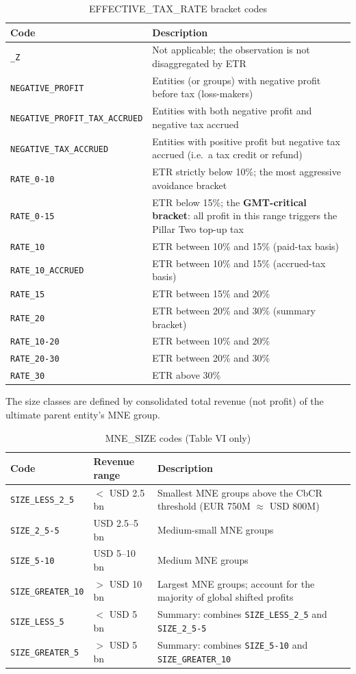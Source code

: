 \documentclass[11pt,a4paper]{article}
\newcommand{\code}[1]{\texttt{#1}}
\begin{document}
\begin{table}[H]
\centering
\caption{EFFECTIVE\_TAX\_RATE bracket codes}
\label{tab:etr}
\begin{tabular}{@{}lp{11cm}@{}}
\toprule
Code & Description \\
\midrule
\code{\_Z} & Not applicable; the observation is not disaggregated by ETR \\
\code{NEGATIVE\_PROFIT} & Entities (or groups) with negative profit before tax (loss-makers) \\
\code{NEGATIVE\_PROFIT\_TAX\_ACCRUED} & Entities with both negative profit and negative tax accrued \\
\code{NEGATIVE\_TAX\_ACCRUED} & Entities with positive profit but negative tax accrued (i.e.\ a tax credit or refund) \\
\code{RATE\_0-10} & ETR strictly below 10\%; the most aggressive avoidance bracket \\
\code{RATE\_0-15} & ETR below 15\%; the \textbf{GMT-critical bracket}: all profit in this range triggers the Pillar Two top-up tax \\
\code{RATE\_10} & ETR between 10\% and 15\% (paid-tax basis) \\
\code{RATE\_10\_ACCRUED} & ETR between 10\% and 15\% (accrued-tax basis) \\
\code{RATE\_15} & ETR between 15\% and 20\% \\
\code{RATE\_20} & ETR between 20\% and 30\% (summary bracket) \\
\code{RATE\_10-20} & ETR between 10\% and 20\% \\
\code{RATE\_20-30} & ETR between 20\% and 30\% \\
\code{RATE\_30} & ETR above 30\% \\
\bottomrule
\end{tabular}
\end{table}

The size classes are defined by consolidated total revenue (not profit) of the ultimate parent entity's MNE group. 

\begin{table}[H]
\centering
\caption{MNE\_SIZE codes (Table VI only)}
\label{tab:mnesize}
\begin{tabular}{@{}llp{8cm}@{}}
\toprule
Code & Revenue range & Description \\
\midrule
\code{SIZE\_LESS\_2\_5} & $<$ USD 2.5 bn & Smallest MNE groups above the CbCR threshold (EUR 750M $\approx$ USD 800M) \\
\code{SIZE\_2\_5-5} & USD 2.5--5 bn & Medium-small MNE groups \\
\code{SIZE\_5-10} & USD 5--10 bn & Medium MNE groups \\
\code{SIZE\_GREATER\_10} & $>$ USD 10 bn & Largest MNE groups; account for the majority of global shifted profits \\
\code{SIZE\_LESS\_5} & $<$ USD 5 bn & Summary: combines \code{SIZE\_LESS\_2\_5} and \code{SIZE\_2\_5-5} \\
\code{SIZE\_GREATER\_5} & $>$ USD 5 bn & Summary: combines \code{SIZE\_5-10} and \code{SIZE\_GREATER\_10} \\
\bottomrule
\end{tabular}
\end{table}
\end{document}
